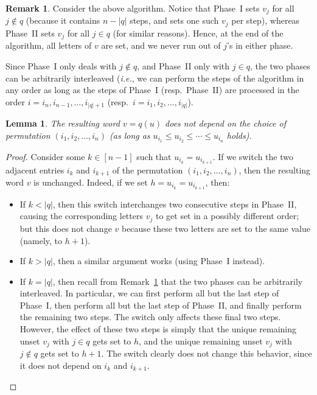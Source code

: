 \documentclass[reqno]{amsart}
\newcommand{\0}{\phantom{c}}
\newcommand{\abs}[1]{\left| #1 \right|}
\newcommand{\tup}[1]{\left( #1 \right)}
\newcommand{\ive}[1]{\left[ #1 \right]}
\theoremstyle{plain}
\newtheorem{lemma}[thm]{Lemma}
\theoremstyle{definition}
\newtheorem{remark}[thm]{Remark}
\numberwithin{equation}{section}
\begin{document}
\begin{remark}
\label{rmk:order-agnostic}
Consider the above algorithm.
Notice that Phase~I sets $v_j$ for all $j \notin q$ (because it contains
$n - \abs{q}$ steps, and sets one such $v_j$ per step),
whereas Phase~II sets $v_j$ for all $j \in q$ (for similar reasons).
Hence, at the end of the algorithm, all letters of $v$ are set, and we never
run out of $j$'s in either phase.

Since Phase~I only deals with $j \notin q$, and Phase~II only with $j\in q$,
the two phases can be arbitrarily interleaved
(\textit{i.e.}, we can perform the steps of the algorithm in any order as long as
the steps of Phase~I (resp.\ Phase~II) are processed in the order $i = i_n, i_{n-1}, \ldots, i_{\abs{q}+1}$
(resp.\ $i = i_1, i_2, \ldots, i_{\abs{q}}$).
\end{remark}

\begin{lemma}
\label{lemma:order_indep}
The resulting word $v = q(u)$ does not depend on the choice of permutation $(i_1, i_2, \dotsc, i_n)$
(as long as $u_{i_1} \leq u_{i_2} \leq \cdots \leq u_{i_n}$ holds).
\end{lemma}

\begin{proof}
Consider some $k \in \ive{n-1}$ such that $u_{i_k} = u_{i_{k+1}}$.
If we switch the two adjacent entries $i_k$ and $i_{k+1}$ of the
permutation $\tup{i_1, i_2, \ldots, i_n}$,
then the resulting word $v$ is unchanged.
Indeed, if we set $h = u_{i_k} = u_{i_{k+1}}$, then:
\begin{itemize}
 \item If $k < \abs{q}$, then this switch interchanges two consecutive
       steps in Phase~II, causing the corresponding letters $v_j$ to
       get set in a possibly different order; but this does not change $v$
       because these two letters are set to the same value
       (namely, to $h+1$).
 \item If $k > \abs{q}$, then a similar argument works (using Phase~I instead).
 \item If $k = \abs{q}$, then recall from Remark~\ref{rmk:order-agnostic} that
       the two phases can be arbitrarily interleaved.
       In particular, we can first perform all but the last step of Phase~I,
       then perform all but the last step of Phase~II,
       and finally perform the remaining two steps.
       The switch only affects these final two steps.
       However, the effect of these two steps is simply that the unique
       remaining unset $v_j$ with $j \in q$ gets set to $h$,
       and the unique remaining unset $v_j$ with $j \notin q$ gets set to $h+1$.
       The switch clearly does not change this behavior,
       since it does not depend on $i_k$ and $i_{k+1}$.
\end{itemize}
\end{proof}
\end{document}

